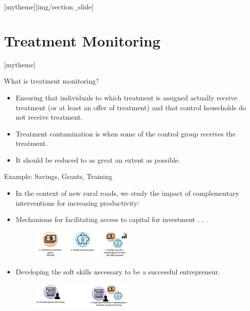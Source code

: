 \documentclass[aspectratio=169]{beamer}
\newcommand{\sectionpic}[2]{
	\setbeamertemplate{section page}[mytheme][#2]
	\section{#1}
	\setbeamertemplate{section page}[mytheme]
}
\begin{document}
\sectionpic{Treatment Monitoring}{img/section_slide}

\begin{frame}{What is treatment monitoring?}

	\begin{itemize}[<default overlay specification>]
	\item<1>   Ensuring that individuals to which treatment is assigned actually receive treatment (or at least an offer of treatment) and that control households do not receive treatment.
	\item<1>   Treatment contamination is when some of the control group receives the treatment.
	\item<1> It should be reduced to as great an extent as possible.
\end{itemize}

\end{frame}


\begin{frame}{Example: Savings, Grants, Training}
	
	\begin{itemize}[<default overlay specification>]
	\item<1>   In the context of new rural roads, we study the impact of complementary interventions for increasing productivity:
	\item<1>  Mechanisms for facilitating access to capital for investment . . .
			\begin{figure}
				\centering
				\includegraphics[width=50mm]{img/Monitoring}
			\end{figure}
	\item<1>  Developing the soft skills necessary to be a successful entrepreneur.
			\begin{figure}
				\centering
				\includegraphics[width=50mm]{img/Monitoring2}
			\end{figure}
	\end{itemize}

\end{frame}
\end{document}
